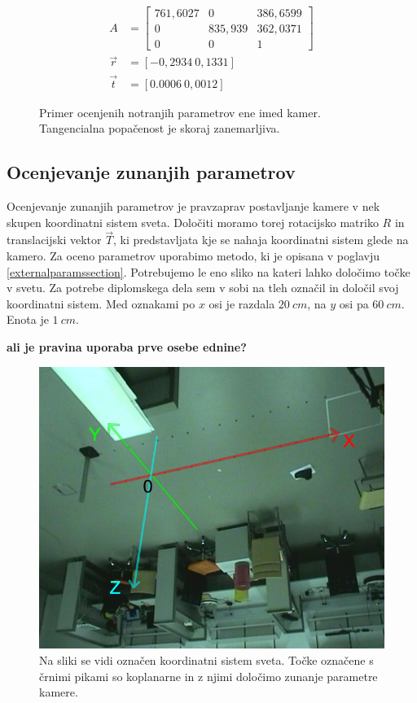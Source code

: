 \documentclass[a4paper, 12pt]{book}
\begin{document}
\begin{figure}[H]
\begin{align}
A &= 
\begin{bmatrix}
761,6027 & 0 & 386,6599 \\
0 & 835,939 & 362,0371 \\
0 & 0 & 1
\end{bmatrix} \\
\vec{r} &= [-0,2934 \ 0,1331] \\
\vec{t} &= [0.0006 \ 0,0012]
\end{align}
\caption{Primer ocenjenih notranjih parametrov ene imed kamer. Tangencialna popačenost je skoraj zanemarljiva.}
\end{figure}


\subsection{Ocenjevanje zunanjih parametrov}
Ocenjevanje zunanjih parametrov je pravzaprav postavljanje kamere v nek skupen koordinatni sistem sveta. Določiti moramo torej rotacijsko matriko $R$ in translacijski vektor $\vec{T}$, ki predstavljata kje se nahaja koordinatni sistem glede na kamero. Za oceno parametrov uporabimo metodo, ki je opisana v poglavju \ref{externalparamssection}. Potrebujemo le eno sliko na kateri lahko določimo točke v svetu. Za potrebe diplomskega dela sem v sobi na tleh označil in določil svoj koordinatni sistem. Med oznakami po $x$ osi je razdala $20 \ cm$, na $y$ osi pa $60 \ cm$. Enota je $1 \ cm$.

\textbf{ali je pravina uporaba prve osebe ednine?}

\begin{figure}[H]
\centering
\includegraphics[width=\textwidth,height=\textheight,keepaspectratio]{coord_system.png}
\caption{Na sliki se vidi označen koordinatni sistem sveta. Točke označene s črnimi pikami so koplanarne in z njimi določimo zunanje parametre kamere.}
\label{coordsystemimg}
\end{figure}
\end{document}
